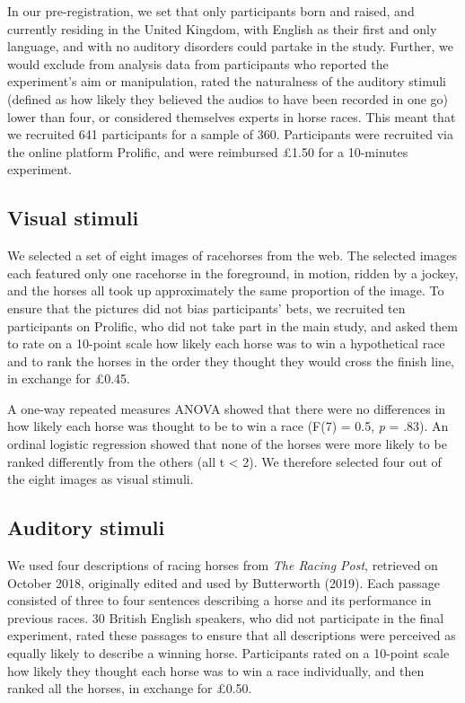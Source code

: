 \documentclass[
  man,floatsintext]{apa7}
\begin{document}
In our pre-registration, we set that only participants born and raised, and currently residing in the United Kingdom, with English as their first and only language, and with no auditory disorders could partake in the study. Further, we would exclude from analysis data from participants who reported the experiment's aim or manipulation, rated the naturalness of the auditory stimuli (defined as how likely they believed the audios to have been recorded in one go) lower than four, or considered themselves experts in horse races. This meant that we recruited 641 participants for a sample of 360. Participants were recruited via the online platform Prolific, and were reimbursed £1.50 for a 10-minutes experiment.

\hypertarget{visual-stimuli}{%
\subsection{Visual stimuli}\label{visual-stimuli}}

We selected a set of eight images of racehorses from the web. The selected images each featured only one racehorse in the foreground, in motion, ridden by a jockey, and the horses all took up approximately the same proportion of the image. To ensure that the pictures did not bias participants' bets, we recruited ten participants on Prolific, who did not take part in the main study, and asked them to rate on a 10-point scale how likely each horse was to win a hypothetical race and to rank the horses in the order they thought they would cross the finish line, in exchange for £0.45.

A one-way repeated measures ANOVA showed that there were no differences in how likely each horse was thought to be to win a race (F(7) = 0.5, \emph{p} = .83). An ordinal logistic regression showed that none of the horses were more likely to be ranked differently from the others (all \textbar t\textbar{} \textless{} 2). We therefore selected four out of the eight images as visual stimuli.

\hypertarget{auditory-stimuli}{%
\subsection{Auditory stimuli}\label{auditory-stimuli}}

We used four descriptions of racing horses from \emph{The Racing Post}, retrieved on October 2018, originally edited and used by Butterworth (2019). Each passage consisted of three to four sentences describing a horse and its performance in previous races. 30 British English speakers, who did not participate in the final experiment, rated these passages to ensure that all descriptions were perceived as equally likely to describe a winning horse. Participants rated on a 10-point scale how likely they thought each horse was to win a race individually, and then ranked all the horses, in exchange for £0.50.
\end{document}
